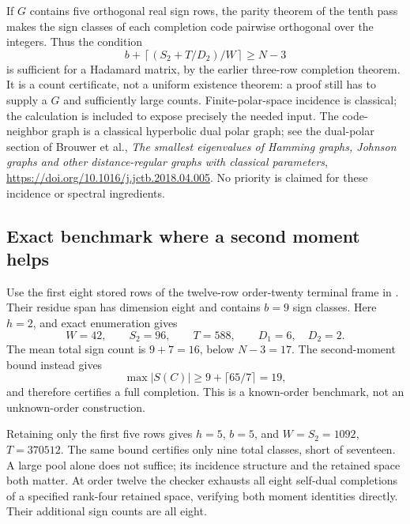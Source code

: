 \documentclass[11pt]{article}
\begin{document}
If $G$ contains five orthogonal real sign rows, the parity theorem
of the tenth pass makes the sign classes of each completion code
pairwise orthogonal over the integers. Thus the condition
\[
 b+\left\lceil(S_2+T/D_2)/W\right\rceil\ge N-3
\]
is sufficient for a Hadamard matrix, by the earlier three-row
completion theorem. It is a count certificate, not a uniform
existence theorem: a proof still has to supply a $G$ and sufficiently
large counts. Finite-polar-space incidence is classical; the
calculation is included to expose precisely the needed input.
The code-neighbor graph is a classical hyperbolic dual polar graph;
see the dual-polar section of Brouwer et al.,
\emph{The smallest eigenvalues of Hamming graphs, Johnson graphs and
other distance-regular graphs with classical parameters},
\url{https://doi.org/10.1016/j.jctb.2018.04.005}.
No priority is claimed for these incidence or spectral ingredients.

\subsection{Exact benchmark where a second moment helps}
Use the first eight stored rows of the twelve-row order-twenty
terminal frame in
. Their residue span has
dimension eight and contains $b=9$ sign classes. Here $h=2$, and
exact enumeration gives
\[
 W=42,\qquad S_2=96,\qquad T=588,\qquad D_1=6,\quad D_2=2.
\]
The mean total sign count is $9+7=16$, below $N-3=17$.
The second-moment bound instead gives
\[
 \max |S(C)|\ge9+\lceil65/7\rceil=19,
\]
and therefore certifies a full completion. This is a known-order
benchmark, not an unknown-order construction.

Retaining only the first five rows gives $h=5$, $b=5$, and
$W=S_2=1092$, $T=370512$. The same bound certifies only nine total
classes, short of seventeen. A large pool alone does not suffice;
its incidence structure and the retained space both matter.
At order twelve the checker exhausts all eight self-dual completions
of a specified rank-four retained space, verifying both moment
identities directly. Their additional sign counts are all eight.
\end{document}
